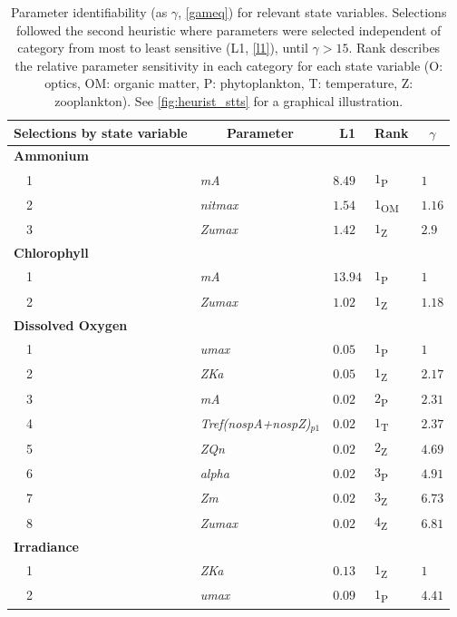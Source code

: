 \documentclass[letterpaper,12pt,oneside]{article}\usepackage[]{graphicx}\usepackage[]{color}
\begin{document}
\begin{table}[!tbp]
{\scriptsize
\caption{Parameter identifiability (as $\gamma$, \cref{gameq}) for relevant state variables.  Selections followed the second heuristic where parameters were selected independent of category from most to least sensitive (L1, \cref{l1}), until $\gamma > 15$.  Rank describes the relative parameter sensitivity in each category for each state variable (O: optics, OM: organic matter, P: phytoplankton, T: temperature, Z: zooplankton). See \cref{fig:heurist_stts} for a graphical illustration.\label{tab:heurist2}} 
\begin{center}
\begin{tabular}{lllll}
\hline\hline
\multicolumn{1}{l}{Selections by state variable}&\multicolumn{1}{c}{Parameter}&\multicolumn{1}{c}{L1}&\multicolumn{1}{c}{Rank}&\multicolumn{1}{c}{$\gamma$}\tabularnewline
\hline
{\bfseries Ammonium}&&&&\tabularnewline
~~1&\scriptsize{\textit{mA}}&$8.49$&$1$\textsubscript{P}&$1$\tabularnewline
~~2&\scriptsize{\textit{nitmax}}&$1.54$&$1$\textsubscript{OM}&$1.16$\tabularnewline
~~3&\scriptsize{\textit{Zumax}}&$1.42$&$1$\textsubscript{Z}&$2.9$\tabularnewline
\hline
{\bfseries Chlorophyll}&&&&\tabularnewline
~~1&\scriptsize{\textit{mA}}&$13.94$&$1$\textsubscript{P}&$1$\tabularnewline
~~2&\scriptsize{\textit{Zumax}}&$1.02$&$1$\textsubscript{Z}&$1.18$\tabularnewline
\hline
{\bfseries Dissolved Oxygen}&&&&\tabularnewline
~~1&\scriptsize{\textit{umax}}&$0.05$&$1$\textsubscript{P}&$1$\tabularnewline
~~2&\scriptsize{\textit{ZKa}}&$0.05$&$1$\textsubscript{Z}&$2.17$\tabularnewline
~~3&\scriptsize{\textit{mA}}&$0.02$&$2$\textsubscript{P}&$2.31$\tabularnewline
~~4&\scriptsize{\textit{Tref(nospA+nospZ)$_{p1}$}}&$0.02$&$1$\textsubscript{T}&$2.37$\tabularnewline
~~5&\scriptsize{\textit{ZQn}}&$0.02$&$2$\textsubscript{Z}&$4.69$\tabularnewline
~~6&\scriptsize{\textit{alpha}}&$0.02$&$3$\textsubscript{P}&$4.91$\tabularnewline
~~7&\scriptsize{\textit{Zm}}&$0.02$&$3$\textsubscript{Z}&$6.73$\tabularnewline
~~8&\scriptsize{\textit{Zumax}}&$0.02$&$4$\textsubscript{Z}&$6.81$\tabularnewline
\hline
{\bfseries Irradiance}&&&&\tabularnewline
~~1&\scriptsize{\textit{ZKa}}&$0.13$&$1$\textsubscript{Z}&$1$\tabularnewline
~~2&\scriptsize{\textit{umax}}&$0.09$&$1$\textsubscript{P}&$4.41$\tabularnewline

\end{tabular}
\end{center}}
\end{table}
\end{document}
